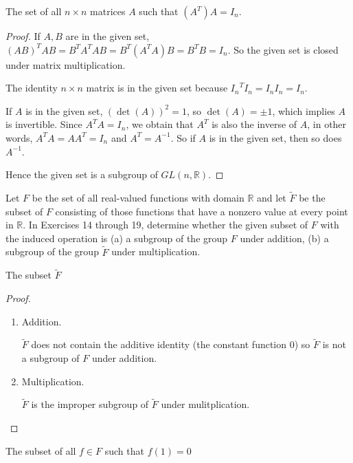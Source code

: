 
\begin{exercise}
    The set of all $n\times n$ matrices $A$ such that $(A^{T})A = I_{n}$.
\end{exercise}

\begin{proof}
    If $A, B$ are in the given set, ${(AB)}^{T}AB = B^{T}A^{T}AB = B^{T}(A^{T}A)B = B^{T}B = I_{n}$. So the given set is closed under matrix multiplication.

    The identity $n\times n$ matrix is in the given set because ${I_{n}}^{T}I_{n} = I_{n}I_{n} = I_{n}$.

    If $A$ is in the given set, ${(\det(A))}^{2} = 1$, so $\det(A) = \pm 1$, which implies $A$ is invertible. Since $A^{T}A = I_{n}$, we obtain that $A^{T}$ is also the inverse of $A$, in other words, $A^{T}A = AA^{T} = I_{n}$ and $A^{T} = A^{-1}$. So if $A$ is in the given set, then so does $A^{-1}$.

    Hence the given set is a subgroup of $GL(n, \mathbb{R})$.
\end{proof}

Let $F$ be the set of all real-valued functions with domain $\mathbb{R}$ and let $\tilde{F}$ be the subset of $F$ consisting of those functions that have a nonzero value at every point in $\mathbb{R}$. In Exercises 14 through 19, determine whether the given subset of $F$ with the induced operation is (a) a subgroup of the group $F$ under addition, (b) a subgroup of the group $\tilde{F}$ under multiplication.

\begin{exercise}
    The subset $\tilde{F}$
\end{exercise}

\begin{proof}
    \begin{enumerate}[label={(\alph*)}]
        \item Addition.

              $\tilde{F}$ does not contain the additive identity (the constant function $0$) so $\tilde{F}$ is not a subgroup of $F$ under addition.
        \item Multiplication.

              $\tilde{F}$ is the improper subgroup of $\tilde{F}$ under mulitplication.
    \end{enumerate}
\end{proof}

\begin{exercise}
    The subset of all $f\in F$ such that $f(1) = 0$
\end{exercise}

